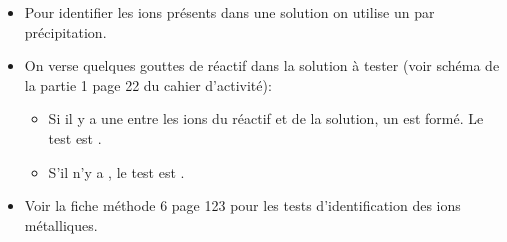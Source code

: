 \begin{mybilan}
	
	\begin{itemize}
		\item Pour identifier les ions présents dans une solution on utilise un  par précipitation.\pause
		
		\item On verse quelques gouttes de réactif dans la solution à tester (voir schéma de la partie 1 page 22 du cahier d'activité):\pause
			\begin{itemize}
				\item Si il y a une  entre les ions du réactif et de la solution, un  est formé. Le test est .
				
				\item S'il n'y a , le test est .\pause
			\end{itemize} 
		
		\item Voir la fiche méthode 6 page 123 pour les tests d'identification des ions métalliques.
	\end{itemize}

	
		

\end{mybilan}